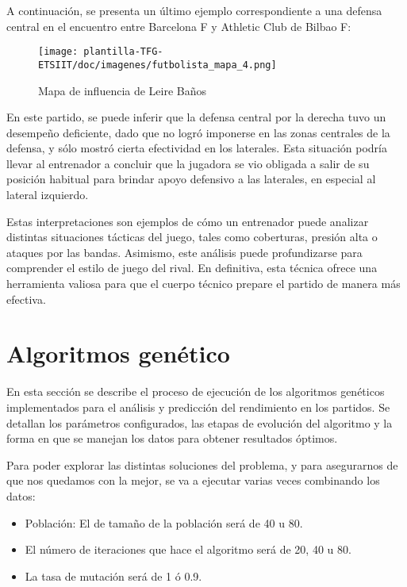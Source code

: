 A continuación, se presenta un último ejemplo correspondiente a una defensa central en el encuentro entre Barcelona F y Athletic Club de Bilbao F:

\begin{figure}[H]
    \centering
    \texttt{[image: plantilla-TFG-ETSIIT/doc/imagenes/futbolista\_mapa\_4.png]}
    \caption{Mapa de influencia de Leire Baños}
    \label{fig:etiqueta-imagen}
\end{figure}

En este partido, se puede inferir que la defensa central por la derecha tuvo un desempeño deficiente, dado que no logró imponerse en las zonas centrales de la defensa, y sólo mostró cierta efectividad en los laterales. Esta situación podría llevar al entrenador a concluir que la jugadora se vio obligada a salir de su posición habitual para brindar apoyo defensivo a las laterales, en especial al lateral izquierdo.

Estas interpretaciones son ejemplos de cómo un entrenador puede analizar distintas situaciones tácticas del juego, tales como coberturas, presión alta o ataques por las bandas. Asimismo, este análisis puede profundizarse para comprender el estilo de juego del rival. En definitiva, esta técnica ofrece una herramienta valiosa para que el cuerpo técnico prepare el partido de manera más efectiva.

\section{Algoritmos genético}
En esta sección se describe el proceso de ejecución de los algoritmos genéticos implementados para el análisis y predicción del rendimiento en los partidos. Se detallan los parámetros configurados, las etapas de evolución del algoritmo y la forma en que se manejan los datos para obtener resultados óptimos. 

Para poder explorar las distintas soluciones del problema, y para asegurarnos de que nos quedamos con la mejor, se va a ejecutar varias veces combinando los datos:

\begin{itemize}
    \item Población: El de tamaño de la población será de 40 u 80.
    \item El número de iteraciones que hace el algoritmo será de 20, 40 u 80.
    \item La tasa de mutación será de 1 ó 0.9.
\end{itemize}

